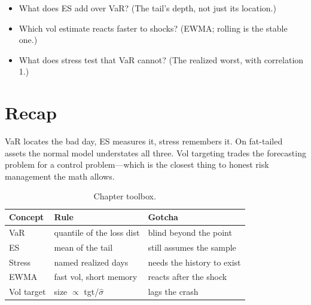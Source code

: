 \begin{checkpoint}
\begin{itemize}
\item What does ES add over VaR? (The tail's depth, not just its location.)
\item Which vol estimate reacts faster to shocks? (EWMA; rolling is the stable one.)
\item What does stress test that VaR cannot? (The realized worst, with correlation 1.)
\end{itemize}
\end{checkpoint}

\section{Recap}\label{sec:riskrecap}

VaR locates the bad day, ES measures it, stress remembers it. On fat-tailed assets the
normal model understates all three. Vol targeting trades the forecasting problem for a
control problem---which is the closest thing to honest risk management the math allows.

\begin{table}[htbp]\centering\small
\caption{Chapter toolbox.}
\begin{tabular}{@{}lll@{}}
\toprule
Concept & Rule & Gotcha\\
\midrule
VaR & quantile of the loss dist & blind beyond the point\\
ES & mean of the tail & still assumes the sample\\
Stress & named realized days & needs the history to exist\\
EWMA & fast vol, short memory & reacts after the shock\\
Vol target & size $\propto$ tgt/$\hat\sigma$ & lags the crash\\
\bottomrule
\end{tabular}
\end{table}

